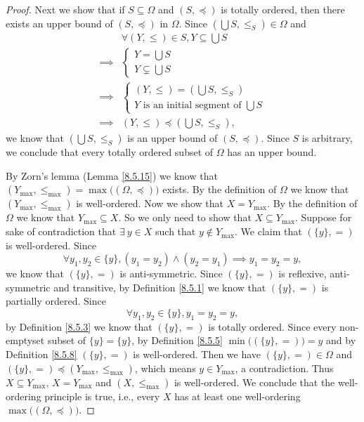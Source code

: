 \begin{proof}
    Next we show that if \(S \subseteq \Omega\) and \((S, \preceq)\) is totally ordered, then there exists an upper bound of \((S, \preceq)\) in \(\Omega\).
    Since \((\bigcup S, \leq_S) \in \Omega\) and
    \begin{align*}
                 & \forall (Y, \leq) \in S, Y \subseteq \bigcup S \\
        \implies & \begin{cases}
                       Y = \bigcup S \\
                       Y \subsetneq \bigcup S
                   \end{cases}                          \\
        \implies & \begin{cases}
                       (Y, \leq) = (\bigcup S, \leq_S) \\
                       Y \text{ is an initial segment of } \bigcup S
                   \end{cases}   \\
        \implies & (Y, \leq) \preceq (\bigcup S, \leq_S),
    \end{align*}
    we know that \((\bigcup S, \leq_S)\) is an upper bound of \((S, \preceq)\).
    Since \(S\) is arbitrary, we conclude that every totally ordered subset of \(\Omega\) has an upper bound.

    By Zorn's lemma (Lemma \ref{8.5.15}) we know that \((Y_{\max}, \leq_{\max}) = \max\big((\Omega, \preceq)\big)\) exists.
    By the definition of \(\Omega\) we know that \((Y_{\max}, \leq_{\max})\) is well-ordered.
    Now we show that \(X = Y_{\max}\).
    By the definition of \(\Omega\) we know that \(Y_{\max} \subseteq X\).
    So we only need to show that \(X \subseteq Y_{\max}\).
    Suppose for sake of contradiction that \(\exists\ y \in X\) such that \(y \notin Y_{\max}\).
    We claim that \((\{y\}, =)\) is well-ordered.
    Since
    \[
        \forall y_1, y_2 \in \{y\}, (y_1 = y_2) \land (y_2 = y_1) \implies y_1 = y_2 = y,
    \]
    we know that \((\{y\}, =)\) is anti-symmetric.
    Since \((\{y\}, =)\) is reflexive, anti-symmetric and transitive, by Definition \ref{8.5.1} we know that \((\{y\}, =)\) is partially ordered.
    Since
    \[
        \forall y_1, y_2 \in \{y\}, y_1 = y_2 = y,
    \]
    by Definition \ref{8.5.3} we know that \((\{y\}, =)\) is totally ordered.
    Since every non-emptyset subset of \(\{y\} = \{y\}\), by Definition \ref{8.5.5} \(\min\big((\{y\}, =)\big) = y\) and by Definition \ref{8.5.8} \((\{y\}, =)\) is well-ordered.
    Then we have \((\{y\}, =) \in \Omega\) and \((\{y\}, =) \preceq (Y_{\max}, \leq_{\max})\), which means \(y \in Y_{\max}\), a contradiction.
    Thus \(X \subseteq Y_{\max}\), \(X = Y_{\max}\) and \((X, \leq_{\max})\) is well-ordered.
    We conclude that the well-ordering principle is true, i.e., every \(X\) has at least one well-ordering \(\max\big((\Omega, \preceq)\big)\).


\end{proof}
